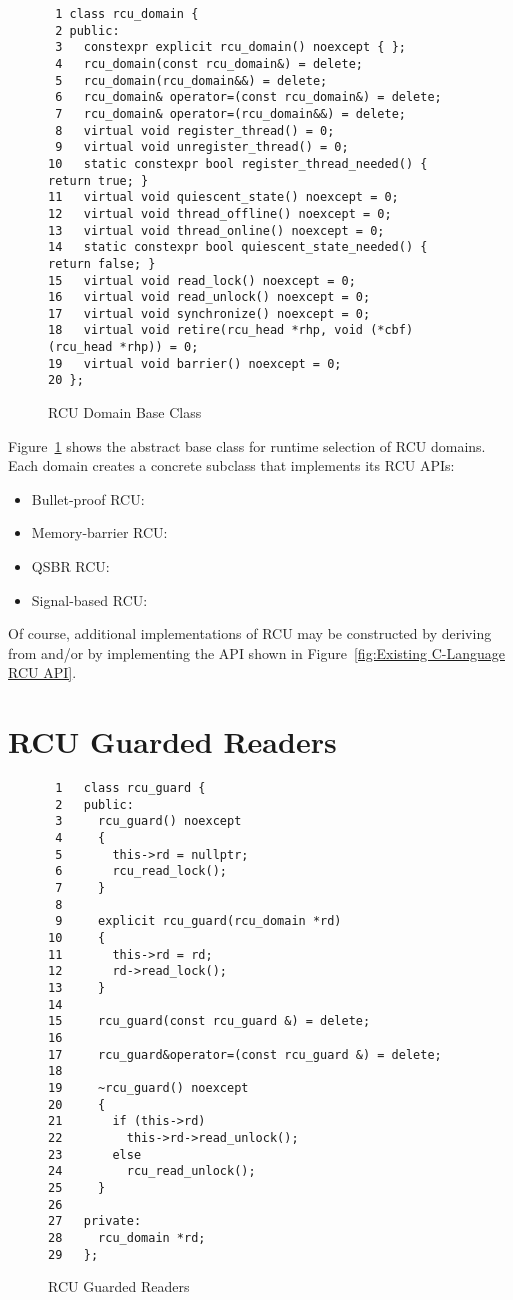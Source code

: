 \documentclass[letterpaper,10pt]{article}
\begin{document}
\begin{figure}[tbp]
{ \scriptsize
\begin{verbatim}
 1 class rcu_domain {
 2 public:
 3   constexpr explicit rcu_domain() noexcept { };
 4   rcu_domain(const rcu_domain&) = delete;
 5   rcu_domain(rcu_domain&&) = delete;
 6   rcu_domain& operator=(const rcu_domain&) = delete;
 7   rcu_domain& operator=(rcu_domain&&) = delete;
 8   virtual void register_thread() = 0;
 9   virtual void unregister_thread() = 0;
10   static constexpr bool register_thread_needed() { return true; }
11   virtual void quiescent_state() noexcept = 0;
12   virtual void thread_offline() noexcept = 0;
13   virtual void thread_online() noexcept = 0;
14   static constexpr bool quiescent_state_needed() { return false; }
15   virtual void read_lock() noexcept = 0;
16   virtual void read_unlock() noexcept = 0;
17   virtual void synchronize() noexcept = 0;
18   virtual void retire(rcu_head *rhp, void (*cbf)(rcu_head *rhp)) = 0;
19   virtual void barrier() noexcept = 0;
20 };
\end{verbatim}
}
\caption{RCU Domain Base Class}
\label{fig:RCU Domain Base Class}
\end{figure}

Figure~\ref{fig:RCU Domain Base Class}
shows the abstract base class for runtime selection of RCU domains.
Each domain creates a concrete subclass that implements its RCU APIs:

\begin{itemize}
\item	Bullet-proof RCU: 
\item	Memory-barrier RCU: 
\item	QSBR RCU: 
\item	Signal-based RCU: 
\end{itemize}

Of course, additional implementations of RCU may be constructed by
deriving from  and/or by implementing the API
shown in
Figure~\ref{fig:Existing C-Language RCU API}.

\section{RCU Guarded Readers}
\label{sec:RCU Guarded Readers}

\begin{figure}[tbp]
{ \scriptsize
\begin{verbatim}
 1   class rcu_guard {
 2   public:
 3     rcu_guard() noexcept
 4     {
 5       this->rd = nullptr;
 6       rcu_read_lock();
 7     }
 8
 9     explicit rcu_guard(rcu_domain *rd)
10     {
11       this->rd = rd;
12       rd->read_lock();
13     }
14
15     rcu_guard(const rcu_guard &) = delete;
16
17     rcu_guard&operator=(const rcu_guard &) = delete;
18
19     ~rcu_guard() noexcept
20     {
21       if (this->rd)
22         this->rd->read_unlock();
23       else
24         rcu_read_unlock();
25     }
26
27   private:
28     rcu_domain *rd;
29   };
\end{verbatim}
}
\caption{RCU Guarded Readers}
\label{fig:RCU Guarded Readers}
\end{figure}
\end{document}
